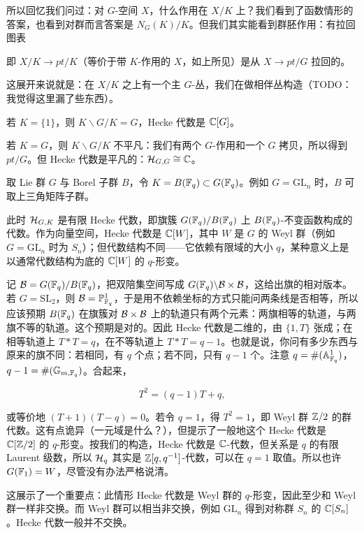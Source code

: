 所以回忆我们问过：对 $G$-空间 $X$，什么作用在 $X/K$ 上？我们看到了函数情形的答案，也看到对群而言答案是 $N_G(K)/K$。但我们其实能看到群胚作用：有拉回图表


即 $X/K\to pt/K$（等价于带 $K$-作用的 $X$，如上所见）是从 $X\to pt/G$ 拉回的。


这展开来说就是：在 $X/K$ 之上有一个主 $G$-丛，我们在做相伴丛构造（TODO：我觉得这里漏了些东西）。

\begin{example}
若 $K=\{1\}$，则 $K\backslash G/K=G$，Hecke 代数是 $\mathbb{C}[G]$。
\end{example}


\begin{example}
若 $K=G$，则 $K\backslash G/K$ 不平凡：我们有两个 $G$-作用和一个 $G$ 拷贝，所以得到 $pt/G$。但 Hecke 代数是平凡的：$\mathcal{H}_{G,G}\cong\mathbb{C}$。
\end{example}

\begin{example}
取 Lie 群 $G$ 与 Borel 子群 $B$，令 $K=B(\mathbb{F}_q)\subset G(\mathbb{F}_q)$。例如 $G=\mathrm{GL}_n$ 时，$B$ 可取上三角矩阵子群。

此时 $\mathcal{H}_{G,K}$ 是有限 Hecke 代数，即旗簇 $G(\mathbb{F}_q)/B(\mathbb{F}_q)$ 上 $B(\mathbb{F}_q)$-不变函数构成的代数。作为向量空间，Hecke 代数是 $\mathbb{C}[W]$，其中 $W$ 是 $G$ 的 Weyl 群（例如 $G=\mathrm{GL}_n$ 时为 $S_n$）；但代数结构不同——它依赖有限域的大小 $q$，某种意义上是以通常代数结构为底的 $\mathbb{C}[W]$ 的 $q$-形变。

记 $\mathcal{B}=G(\mathbb{F}_q)/B(\mathbb{F}_q)$，把双陪集空间写成 $G(\mathbb{F}_q)\backslash \mathcal{B}\times\mathcal{B}$，这给出旗的相对版本。若 $G=\mathrm{SL}_2$，则 $\mathcal{B}=\mathbb{P}^1_{\mathbb{F}_q}$，于是用不依赖坐标的方式只能问两条线是否相等，所以应该预期 $B(\mathbb{F}_q)$ 在旗簇对 $\mathcal{B}\times\mathcal{B}$ 上的轨道只有两个元素：两旗相等的轨道，与两旗不等的轨道。这个预期是对的。因此 Hecke 代数是二维的，由 $\{1,T\}$ 张成；在相等轨道上 $T*T=q$，在不等轨道上 $T*T=q-1$。也就是说，你问有多少东西与原来的旗不同：若相同，有 $q$ 个点；若不同，只有 $q-1$ 个。注意 $q=\#(\mathbb{A}^1_{\mathbb{F}_q})$，$q-1=\#(\mathbb{G}_{m,\mathbb{F}_q})$。合起来，

\[T^2=(q-1)T+q,\]

或等价地 $(T+1)(T-q)=0$。若令 $q=1$，得 $T^2=1$，即 Weyl 群 $\mathbb{Z}/2$ 的群代数。这有点诡异（一元域是什么？），但提示了一般地这个 Hecke 代数是 $\mathbb{C}[\mathbb{Z}/2]$ 的 $q$-形变。按我们的构造，Hecke 代数是 $\mathbb{C}$-代数，但关系是 $q$ 的有限 Laurent 级数，所以 $\mathcal{H}_q$ 其实是 $\mathbb{Z}[q,q^{-1}]$-代数，可以在 $q=1$ 取值。所以也许 $G(\mathbb{F}_1)=W$，尽管没有办法严格说清。

这展示了一个重要点：此情形 Hecke 代数是 Weyl 群的 $q$-形变，因此至少和 Weyl 群一样非交换。而 Weyl 群可以相当非交换，例如 $\mathrm{GL}_n$ 得到对称群 $S_n$ 的 $\mathbb{C}[S_n]$。Hecke 代数一般并不交换。
\end{example}


